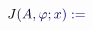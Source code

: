 \documentclass[12pt]{article}
\begin{document}
\makeatletter
\renewcommand*{\@textcolor}[3]{%
  \protect\leavevmode
  \begingroup
    \color#1{#2}#3%
  \endgroup
}
\makeatother
\begin{displaymath}
\mathcolor[RGB]{0,0,15}{J} \mathcolor[RGB]{0,0,30}{(} \mathcolor[RGB]{0,0,45}{A} \mathcolor[RGB]{0,0,60}{,} \mathcolor[RGB]{0,0,75}{\varphi} \mathcolor[RGB]{0,0,90}{;} \mathcolor[RGB]{0,0,105}{x} \mathcolor[RGB]{0,0,120}{)} \mathcolor[RGB]{0,0,135}{:} \mathcolor[RGB]{0,0,150}{=}
\end{displaymath}
\end{document}

